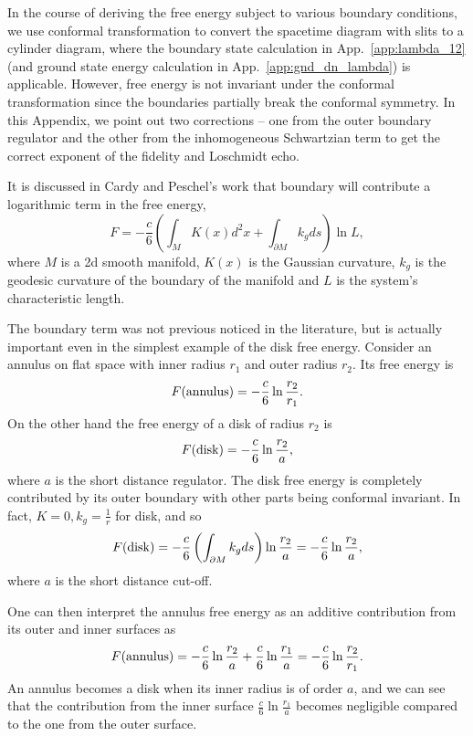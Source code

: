 
In the course of deriving the free energy subject to various boundary conditions, we use conformal transformation to convert the spacetime diagram with slits to a cylinder diagram, where the boundary state calculation in App.~\ref{app:lambda_12} (and ground state energy calculation in App.~\ref{app:gnd_dn_lambda}) is applicable. However, free energy is not invariant under the conformal transformation since the boundaries partially break the conformal symmetry. In this Appendix, we point out two corrections -- one from the outer boundary regulator and the other from the inhomogeneous Schwartzian term to get the correct exponent of the fidelity and Loschmidt echo. 

It is discussed in Cardy and Peschel's work\cite{cardy_finite-size_1988} that boundary will contribute a logarithmic term in the free energy,
\begin{equation}
F = - \frac{c}{6} \left( \int_M  K(x) d^2x + \int_{\partial M} k_g ds \right)  \ln L , 
\end{equation}
where $M$ is a 2d smooth manifold, $K(x)$ is the Gaussian curvature, $k_g$ is the geodesic curvature of the boundary of the manifold and $L$ is the system's characteristic length. 

The boundary term was not previous noticed in the literature, but is actually important even in the simplest example of the disk free energy. Consider an annulus on flat space with inner radius $r_1$ and outer radius $r_2$. Its free energy is
\begin{equation}
F({\rm annulus}) = -  \frac{c}{6} \ln \frac{r_2}{r_1} .
\end{equation}
On the other hand the free energy of a disk of radius $r_2$ is
\begin{equation}
  F( {\rm disk} ) = - \frac{c}{6} \ln \frac{r_2}{a},
\end{equation}
where $a$ is the short distance regulator. The disk free energy is completely contributed by its outer boundary with other parts being conformal invariant. In fact, $K = 0, k_g = \frac{1}{r}$ for disk, and so 
\begin{equation}
F( {\rm disk}  ) = - \frac{c}{6}  \left( \int_{\partial M} k_g ds \right)  \ln \frac{r_2}{a}  = - \frac{c}{6}  \ln \frac{r_2}{a} , 
\end{equation}
where $a$ is the short distance cut-off. 

One can then interpret the annulus free energy as an additive contribution from its outer and inner surfaces as
\begin{equation}
F( {\rm annulus} ) = -  \frac{c}{6} \ln \frac{r_2}{a} +  \frac{c}{6} \ln \frac{r_1}{a} = - \frac{c}{6} \ln \frac{r_2}{r_1}.
\end{equation}
An annulus becomes a disk when its inner radius is of order $a$, and we can see that the contribution from the inner surface $\frac{c}{6} \ln \frac{r_1}{a}$ becomes negligible compared to the one from the outer surface.  

